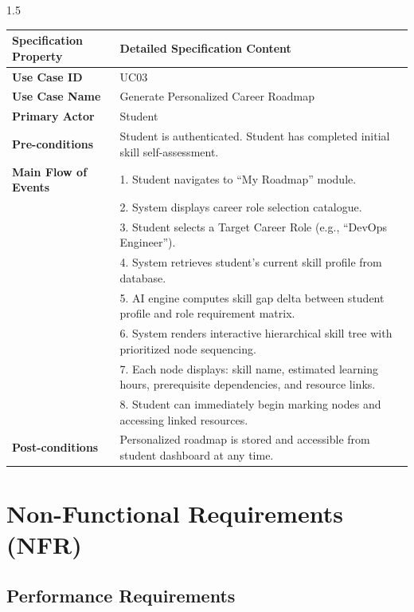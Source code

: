\documentclass[12pt,a4paper]{report}
\begin{document}
\begin{spacing}{1.5}
		\begin{longtable}{|p{4.5cm}|p{10.5cm}|}
			\hline
			\rowcolor{gray!20}\textbf{Specification Property} & \textbf{Detailed Specification Content} \\ \hline
			\textbf{Use Case ID} & UC03 \\ \hline
			\textbf{Use Case Name} & Generate Personalized Career Roadmap \\ \hline
			\textbf{Primary Actor} & Student \\ \hline
			\textbf{Pre-conditions} & Student is authenticated. Student has completed initial skill self-assessment. \\ \hline
			\textbf{Main Flow of Events} &
			1. Student navigates to ``My Roadmap'' module.\\
			& 2. System displays career role selection catalogue.\\
			& 3. Student selects a Target Career Role (e.g., ``DevOps Engineer'').\\
			& 4. System retrieves student's current skill profile from database.\\
			& 5. AI engine computes skill gap delta between student profile and role requirement matrix.\\
			& 6. System renders interactive hierarchical skill tree with prioritized node sequencing.\\
			& 7. Each node displays: skill name, estimated learning hours, prerequisite dependencies, and resource links.\\
			& 8. Student can immediately begin marking nodes and accessing linked resources.\\ \hline
			\textbf{Post-conditions} & Personalized roadmap is stored and accessible from student dashboard at any time. \\ \hline
		\end{longtable}
		
		\section{Non-Functional Requirements (NFR)}
		
		\subsection{Performance Requirements}
		

\end{spacing}
\end{document}
